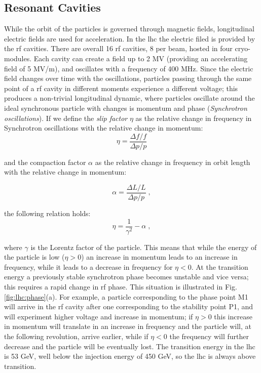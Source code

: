 \subsection{Resonant Cavities}

While the orbit of the particles is governed through magnetic fields, longitudinal electric fields are used for acceleration. In the \gls{lhc} the electric filed is provided by the \gls{rf} cavities. There are overall 16 \gls{rf} cavities, 8 per beam, hosted in four cryo-modules. Each cavity can create a field up to 2 MV (providing an accelerating field of 5 MV/m), and oscillates with a frequency of 400 MHz. Since the electric field changes over time with the oscillations, particles passing through the same point of a \gls{rf} cavity in different moments experience a different voltage; this produces a non-trivial longitudinal dynamic, where particles oscillate around the ideal synchronous particle with changes is momentum and phase (\textit{Synchrotron oscillations}). If we define the \textit{slip factor} $\eta$ as the relative change in frequency in Synchrotron oscillations with the relative change in momentum:
\begin{equation}
\eta = \frac{\Delta f / f}{\Delta p / p}
\end{equation}

and the compaction factor $\alpha$ as the relative change in frequency in orbit length with the relative change in momentum:

\begin{equation}
\alpha = \frac{\Delta L / L}{\Delta p / p} \; ,
\end{equation}

the following relation holds:
\begin{equation}
\eta = \frac{1}{\gamma^2} - \alpha \; ,
\end{equation}

where $\gamma$ is the Lorentz factor of the particle. This means that while the energy of the particle is low ($\eta>0$) an increase in momentum leads to an increase in frequency, while it leads to a decrease in frequency for $\eta<0$. At the transition energy a previously stable synchrotron phase becomes unstable and vice versa; this requires a rapid change in \gls{rf} phase. This situation is illustrated in Fig. \ref{fig:lhc:phase}(a). For example, a particle corresponding to the phase point M1 will arrive in the \gls{rf} cavity after one corresponding to the stability point P1, and will experiment higher voltage and increase in momentum; if $\eta>0$ this increase in momentum will translate in an increase in frequency and the particle will, at the following revolution, arrive earlier, while if $\eta<0$ the frequency will further decrease and the particle will be eventually lost.  The transition energy in the \gls{lhc} is 53 GeV, well below the injection energy of 450 GeV, so the \gls{lhc} is always above transition. 


